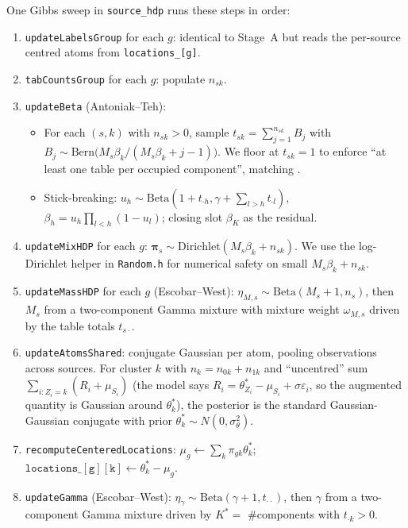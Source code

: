 \documentclass[11pt]{article}
\newcommand{\1}{\mathbf{1}}
\begin{document}
One Gibbs sweep in \texttt{source\_hdp} runs these steps in order:
\begin{enumerate}[noitemsep, label=(\arabic*)]
  \item \texttt{updateLabelsGroup} for each $g$: identical to Stage~A but reads the per-source centred atoms from \texttt{locations\_[g]}.
  \item \texttt{tabCountsGroup} for each $g$: populate $n_{sk}$.
  \item \texttt{updateBeta} (Antoniak--Teh):
    \begin{itemize}[noitemsep]
      \item For each $(s, k)$ with $n_{sk} > 0$, sample $t_{sk} = \sum_{j=1}^{n_{sk}} B_{j}$ with $B_j \sim \mathrm{Bern}\big(M_s \beta_k / (M_s \beta_k + j - 1)\big)$. We floor at $t_{sk} = 1$ to enforce ``at least one table per occupied component'', matching \citet{teh2006hierarchical}.
      \item Stick-breaking: $u_h \sim \mathrm{Beta}(1 + t_{\cdot h}, \gamma + \sum_{l > h} t_{\cdot l})$, $\beta_h = u_h \prod_{l < h}(1 - u_l)$; closing slot $\beta_K$ as the residual.
    \end{itemize}
  \item \texttt{updateMixHDP} for each $g$: $\bm{\pi}_s \sim \mathrm{Dirichlet}(M_s \beta_k + n_{sk})$. We use the log-Dirichlet helper in \texttt{Random.h} for numerical safety on small $M_s \beta_k + n_{sk}$.
  \item \texttt{updateMassHDP} for each $g$ (Escobar--West): $\eta_{M,s} \sim \mathrm{Beta}(M_s + 1, n_s)$, then $M_s$ from a two-component Gamma mixture with mixture weight $\omega_{M,s}$ driven by the table totals $t_{s\cdot}$.
  \item \texttt{updateAtomsShared}: conjugate Gaussian per atom, pooling observations across sources. For cluster $k$ with $n_k = n_{0k} + n_{1k}$ and ``uncentred'' sum $\sum_{i: Z_i = k}(R_i + \mu_{S_i})$ (the model says $R_i = \theta^*_{Z_i} - \mu_{S_i} + \sigma\varepsilon_i$, so the augmented quantity is Gaussian around $\theta^*_k$), the posterior is the standard Gaussian-Gaussian conjugate with prior $\theta^*_k \sim N(0, \sigma_\theta^2)$.
  \item \texttt{recomputeCenteredLocations}: $\mu_g \leftarrow \sum_k \pi_{gk}\theta^*_k$; $\mathtt{locations\_[g][k]} \leftarrow \theta^*_k - \mu_g$.
  \item \texttt{updateGamma} (Escobar--West): $\eta_\gamma \sim \mathrm{Beta}(\gamma + 1, t_{\cdot\cdot})$, then $\gamma$ from a two-component Gamma mixture driven by $K^* = $ \#components with $t_{\cdot k} > 0$.
\end{enumerate}
\end{document}
